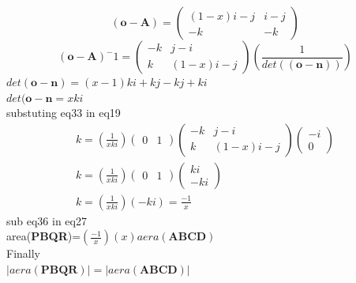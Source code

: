 \documentclass[journal,10pt,twocolumn]{article}
\begin{document}
\begin{equation}
    (\boldsymbol{o}-\boldsymbol{A})=
    \begin{pmatrix}
        (1-x)i-j & i-j \\
        -k       & -k
    \end{pmatrix}
\end{equation}
\begin{equation}
     (\boldsymbol{o}-\boldsymbol{A})^-1=
     \begin{pmatrix}
         -k & j-i\\
         k  & (1-x)i-j
     \end{pmatrix}
     (\frac{1}{det((\boldsymbol{o}-\boldsymbol{n}))})
\end{equation}
$det(\boldsymbol{o}-\boldsymbol{n})=(x-1)ki+kj-kj+ki$\\
$det(\boldsymbol{o}-\boldsymbol{n}=xki$\\
substuting eq33 in eq19
\begin{eqnarray}
    k=(\frac{1}{xki})
    \begin{pmatrix}
        0 & 1
    \end{pmatrix}
    \begin{pmatrix}
        -k & j-i\\
        k & (1-x)i-j
    \end{pmatrix}
    \begin{pmatrix}
        -i\\
        0
    \end{pmatrix}\\
    k=(\frac{1}{xki})
    \begin{pmatrix}
        0 &1
    \end{pmatrix}
    \begin{pmatrix}
        ki\\
        -ki
    \end{pmatrix}\\
    k=(\frac{1}{xki})(-ki)=\frac{-1}{x}
\end{eqnarray}
sub eq36 in eq27\\
area(\textbf{PBQR})=$(\frac{-1}{x})(x)aera(\textbf{ABCD})$\\
Finally\\
      $|aera(\textbf{PBQR})|=|aera(\textbf{ABCD})|$
\end{document}
